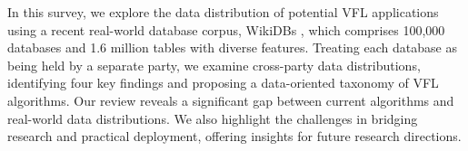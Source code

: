 In this survey, we explore the data distribution of potential VFL applications using a recent real-world database corpus, WikiDBs \cite{vogel2024wikidbs}, which comprises 100,000 databases and 1.6 million tables with diverse features. Treating each database as being held by a separate party, we examine cross-party data distributions, identifying four key findings and proposing a data-oriented taxonomy of VFL algorithms. Our review reveals a significant gap between current algorithms and real-world data distributions. We also highlight the challenges in bridging research and practical deployment, offering insights for future research directions.

